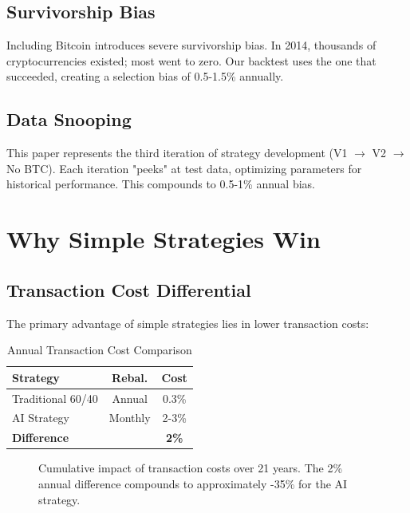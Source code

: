 \documentclass[twocolumn,ieee]{arithmaxresearch}
\begin{document}
\subsection{Survivorship Bias}

Including Bitcoin introduces severe survivorship bias. In 2014, thousands of cryptocurrencies existed; most went to zero. Our backtest uses the one that succeeded, creating a selection bias of 0.5-1.5\% annually.

\subsection{Data Snooping}

This paper represents the third iteration of strategy development (V1 $\rightarrow$ V2 $\rightarrow$ No BTC). Each iteration "peeks" at test data, optimizing parameters for historical performance. This compounds to 0.5-1\% annual bias.

\section{Why Simple Strategies Win}

\subsection{Transaction Cost Differential}

The primary advantage of simple strategies lies in lower transaction costs:

\begin{table}[h]
\centering
\caption{Annual Transaction Cost Comparison}
\begin{tabular}{lcc}
\toprule
\textbf{Strategy} & \textbf{Rebal.} & \textbf{Cost} \\
\midrule
Traditional 60/40 & Annual & 0.3\% \\
AI Strategy & Monthly & 2-3\% \\
\midrule
\textbf{Difference} & & \textbf{2\%} \\
\bottomrule
\end{tabular}
\end{table}

\begin{figure}[h]
\centering
{}
\caption{Cumulative impact of transaction costs over 21 years. The 2\% annual difference compounds to approximately -35\% for the AI strategy.}
\label{fig:cost_impact}
\end{figure}
\end{document}
